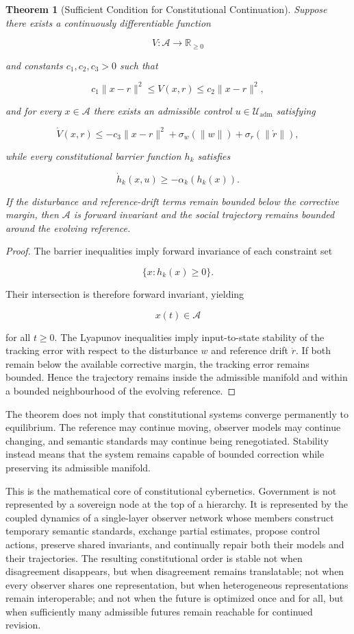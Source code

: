 \documentclass[12pt,a4paper]{article}
\newtheorem{theorem}{Theorem}
\begin{document}
\begin{theorem}[Sufficient Condition for Constitutional Continuation]
Suppose there exists a continuously differentiable function

\[
V:\mathcal{A}\rightarrow\mathbb{R}_{\geq 0}
\]

and constants \(c_1,c_2,c_3>0\) such that

\[
c_1\|x-r\|^2
\leq
V(x,r)
\leq
c_2\|x-r\|^2,
\]

and for every \(x\in\mathcal{A}\) there exists an admissible control \(u\in\mathcal{U}_{\mathrm{adm}}\) satisfying

\[
\dot{V}(x,r)
\leq
-c_3\|x-r\|^2
+
\sigma_w(\|w\|)
+
\sigma_r(\|\dot{r}\|),
\]

while every constitutional barrier function \(h_k\) satisfies

\[
\dot{h}_k(x,u)
\geq
-\alpha_k(h_k(x)).
\]

If the disturbance and reference-drift terms remain bounded below the corrective margin, then \(\mathcal{A}\) is forward invariant and the social trajectory remains bounded around the evolving reference.
\end{theorem}

\begin{proof}
The barrier inequalities imply forward invariance of each constraint set

\[
\{x:h_k(x)\geq 0\}.
\]

Their intersection is therefore forward invariant, yielding

\[
x(t)\in\mathcal{A}
\]

for all \(t\geq 0\). The Lyapunov inequalities imply input-to-state stability of the tracking error with respect to the disturbance \(w\) and reference drift \(\dot{r}\). If both remain below the available corrective margin, the tracking error remains bounded. Hence the trajectory remains inside the admissible manifold and within a bounded neighbourhood of the evolving reference.
\end{proof}

The theorem does not imply that constitutional systems converge permanently to equilibrium. The reference may continue moving, observer models may continue changing, and semantic standards may continue being renegotiated. Stability instead means that the system remains capable of bounded correction while preserving its admissible manifold.

This is the mathematical core of constitutional cybernetics. Government is not represented by a sovereign node at the top of a hierarchy. It is represented by the coupled dynamics of a single-layer observer network whose members construct temporary semantic standards, exchange partial estimates, propose control actions, preserve shared invariants, and continually repair both their models and their trajectories. The resulting constitutional order is stable not when disagreement disappears, but when disagreement remains translatable; not when every observer shares one representation, but when heterogeneous representations remain interoperable; and not when the future is optimized once and for all, but when sufficiently many admissible futures remain reachable for continued revision.
\end{document}
